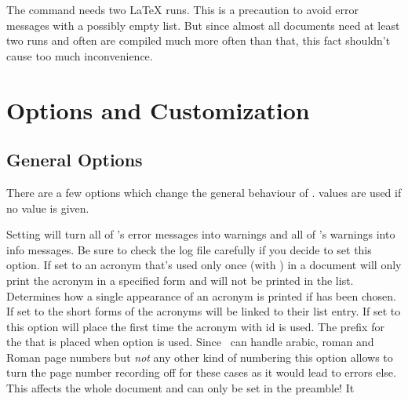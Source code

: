 \documentclass[load-preamble+]{cnltx-doc}
\begin{document}
The command  needs two \LaTeX{} runs.  This is a precaution
to avoid error messages with a possibly empty list.  But since almost all
documents need at least two runs and often are compiled much more often than
that, this fact shouldn't cause too much inconvenience.

\section{Options and Customization}\label{sec:customization}
\subsection{General Options}
There are a few options which change the general behaviour of \acro.
 values are used if no value is given.
\begin{options}
    Setting  will turn all of
    \acro's error messages into warnings and all of \acro's warnings into info
    messages.  Be sure to check the log file carefully if you decide to set
    this option.
    If set to  an acronym that's used only once (with ) in a
    document will only print the acronym in a specified form and will not be
    printed in the list.
    Determines how a single appearance of an acronym is
    printed if  has been chosen.
    If set to  the short forms of the acronyms will be linked to
    their list entry.
    If set to  this option will place
     the first time the acronym with
    \ac{id}  is used.
    The prefix for the  that is placed when
    option  is used.
    Since \acro\ can handle arabic, roman and Roman page numbers but
    \emph{not} any other kind of numbering this option allows to turn the page
    number recording off for these cases as it would lead to errors else.
    This affects the whole document and can only be set in the preamble!  It

\end{options}
\end{document}
